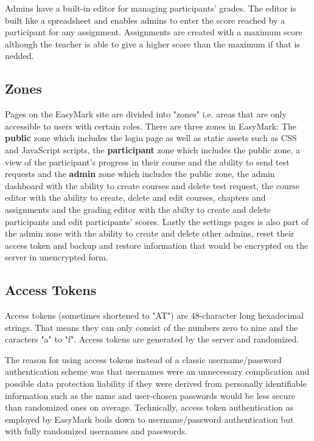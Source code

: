 \documentclass[12pt,a4paper,oneside]{report}
\begin{document}
	Admins have a built-in editor for managing participants' grades. The editor is built like a spreadsheet and enables admins to enter the score reached by a participant for any assignment. Assignments are created with a maximum score although the teacher is able to give a higher score than the maximum if that is nedded.

	\subsection{Zones}
	Pages on the EasyMark site are divided into "zones" i.e. areas that are only accessible to users with certain roles. There are three zones in EasyMark: The \textbf{public} zone which includes the login page as well as static assets such as CSS and JavaScript scripts, the \textbf{participant} zone which includes the public zone, a view of the participant's progress in their course and the ability to send test requests and the \textbf{admin} zone which includes the public zone, the admin dashboard with the ability to create courses and delete test request, the course editor with the ability to create, delete and edit courses, chapters and assignments and the grading editor with the abilty to create and delete participants and edit participants' scores. Lastly the settings pages is also part of the admin zone with the ability to create and delete other admins, reset their access token and backup and restore information that would be encrypted on the server in unencrypted form.

	\subsection{Access Tokens} \label{subsec:accesstokens}
	Access tokens (sometimes shortened to "AT") are 48-character long hexadecimal strings. That means they can only consist of the numbers zero to nine and the caracters "a" to "f". Access tokens are generated by the server and randomized.

	The reason for using access tokens instead of a classic username/password authentication scheme was that usernames were an unnecessary complication and possible data protection liability if they were derived from personally identifiable information such as the name and user-chosen passwords would be less secure than randomized ones on average. Technically, access token authentication as employed by EasyMark boils down to username/password authentication but with fully randomized usernames and passwords.
\end{document}
